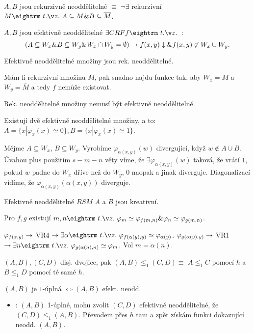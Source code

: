 \begin{multicols}{3}

\dfn{} $A,B$ jsou rekurzivně neoddělitelné $\equiv$ $\neg\exists$ rekurzivní $M \st A \subseteq M \& B \subseteq \overline{M}$.

\dfn{} $A,B$ jsou efektivně neoddělitelné $\exists CRF f \st:$
$$(A \subseteq W_x \& B \subseteq W_y \& W_x \cap W_y = \emptyset) \rightarrow f(x,y)\downarrow \& f(x,y) \not \in W_x \cup W_y. $$

\obs{} Efektivně neoddělitelné množiny jsou rek. neoddělitelné. 

\prf{} Mám-li rekurzivní množinu $M$, pak snadno najdu funkce tak, aby $W_x = M$ a $W_y = \overline{M}$ a tedy $f$
nemůže existovat.

\thm{} Rek. neoddělitelné množiny nemusí být efektivně neoddělitelné.

\thm{} Existují dvě efektivně neoddělitelné množiny, a to:
$A = \{x | \varphi_x(x) \simeq 0 \}, B = \{ x | \varphi_x(x) \simeq 1 \}$.

\prf{} Mějme $A \subseteq W_x$, $B \subseteq W_y$. Vyrobíme $\varphi_{\alpha(x,y)}(w)$ divergující, když $w \not \in A \cup B$.
Úvahou plus použitím $s-m-n$ věty víme, že $\exists \varphi_{\alpha(x,y)}(w)$ taková, že vrátí $1$, pokud $w$ padne do $W_x$ dříve než do $W_y$, $0$ naopak a jinak diverguje. Diagonalizací vidíme, že $\varphi_{\alpha(x,y)}(\alpha(x,y))$ diverguje.

\obs{} Efektivně neoddělitelné $RSM$ $A$ a $B$ jsou kreativní.

 Pro \ORF $f,g$ existují $m,n \st \varphi_m \simeq \varphi_{f(m,n)} \& \varphi_n \simeq \varphi_{g(m,n)}$.

\prf{} $\varphi_{f(x,y)} \rightarrow$ VR4 $\then \exists \alpha \st \varphi_{f(\alpha(y),y)} \simeq \varphi_{\alpha(y)}$.
$\varphi_{g(\alpha(y),y)} \rightarrow$ VR1 $\then \exists n \st \varphi_{g(\alpha(n), n)} \simeq \varphi_m$. Vol $m = \alpha(n)$.

 $(A,B),(C,D)$ disj. dvojice, pak $(A,B) \le_1 (C,D) \equiv$ $A \le_1 C$ pomocí $h$ a $B \le_1 D$ pomocí té samé $h$.

 $(A,B)$ je $1$-úplná $\iff (A,B)$ efekt. neodd.

\prf{}

\begin{itemize}
\item \uv{$\then$}: $(A,B)$ 1-úplné, mohu zvolit $(C,D)$ efektivně neoddělitelné,
že $(C,D) \le_1 (A,B)$. Převodem přes $h$ tam a zpět získám funkci dokazující
neodd. $(A,B)$.


\end{itemize}
\end{multicols}
